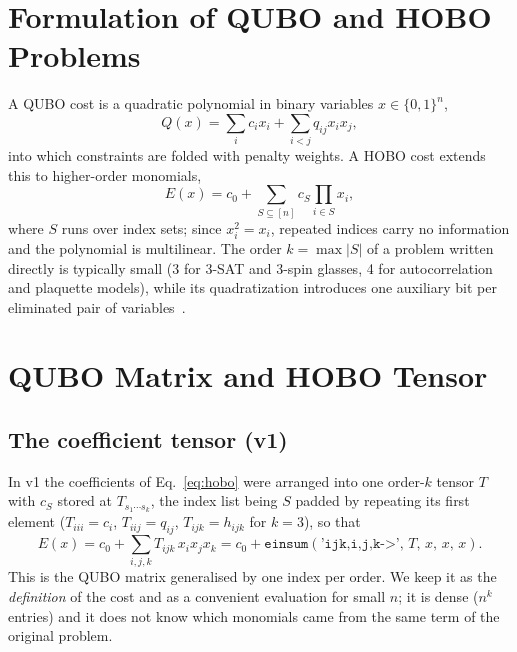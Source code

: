\documentclass{article}
\begin{document}
\section{Formulation of QUBO and HOBO Problems}
\label{sec:formulation}

A QUBO cost is a quadratic polynomial in binary variables $x\in\{0,1\}^n$,
\begin{equation}
Q(x) = \sum_{i} c_i x_i + \sum_{i<j} q_{ij} x_i x_j ,
\end{equation}
into which constraints are folded with penalty weights. A HOBO cost extends this to higher-order monomials,
\begin{equation}
E(x) = c_0 + \sum_{S\subseteq[n]} c_S \prod_{i\in S} x_i ,
\label{eq:hobo}
\end{equation}
where $S$ runs over index sets; since $x_i^2=x_i$, repeated indices carry no information and the polynomial is multilinear. The order $k=\max|S|$ of a problem written directly is typically small (3 for 3-SAT and 3-spin glasses, 4 for autocorrelation and plaquette models), while its quadratization introduces one auxiliary bit per eliminated pair of variables~\cite{rosenberg1975reduction,boros2002pseudoboolean}.

\section{QUBO Matrix and HOBO Tensor}
\label{sec:tensor}

\subsection{The coefficient tensor (v1)}
In v1 the coefficients of Eq.~\eqref{eq:hobo} were arranged into one order-$k$ tensor $T$ with $c_S$ stored at $T_{s_1\cdots s_k}$, the index list being $S$ padded by repeating its first element ($T_{iii}=c_i$, $T_{iij}=q_{ij}$, $T_{ijk}=h_{ijk}$ for $k=3$), so that
\begin{equation}
E(x) = c_0 + \sum_{i,j,k} T_{ijk}\, x_i x_j x_k = c_0 + \texttt{einsum}(\texttt{'ijk,i,j,k->'},\,T,\,x,\,x,\,x).
\label{eq:einsum}
\end{equation}
This is the QUBO matrix generalised by one index per order. We keep it as the \emph{definition} of the cost and as a convenient evaluation for small $n$; it is dense ($n^k$ entries) and it does not know which monomials came from the same term of the original problem.
\end{document}
